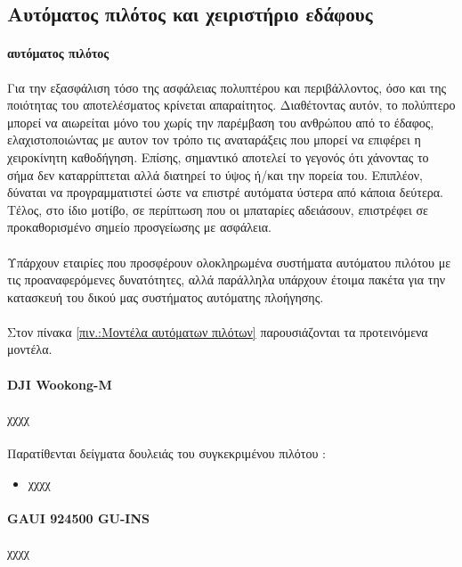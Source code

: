 \documentclass[a4paper, 12pt, twoside]{report}
\begin{document}
{{{{{{			
		\subsection{Αυτόματος πιλότος και χειριστήριο εδάφους}
			\paragraph{αυτόματος πιλότος}{Για την εξασφάλιση τόσο της ασφάλειας πολυπτέρου και περιβάλλοντος, όσο και της ποιότητας του αποτελέσματος κρίνεται απαραίτητος. Διαθέτοντας αυτόν, το πολύπτερο μπορεί να αιωρείται μόνο του χωρίς την παρέμβαση του ανθρώπου από το έδαφος, ελαχιστοποιώντας με αυτον τον τρόπο τις αναταράξεις που μπορεί να επιφέρει η χειροκίνητη καθοδήγηση. Επίσης, σημαντικό αποτελεί το γεγονός ότι χάνοντας το σήμα δεν καταρρίπτεται αλλά διατηρεί το ύψος ή/και την πορεία του. Επιπλέον, δύναται να προγραμματιστεί ώστε να επιστρέ αυτόματα ύστερα από κάποια δεύτερα. Τέλος, στο ίδιο μοτίβο, σε περίπτωση που οι μπαταρίες αδειάσουν, επιστρέφει σε προκαθορισμένο σημείο προσγείωσης με ασφάλεια.
			}
			\paragraph{}{Υπάρχουν εταιρίες που προσφέρουν ολοκληρωμένα συστήματα αυτόματου πιλότου με τις προαναφερόμενες δυνατότητες, αλλά παράλληλα υπάρχουν έτοιμα πακέτα για την κατασκευή του δικού μας συστήματος αυτόματης πλοήγησης.
			}
			\paragraph{}{Στον πίνακα \ref{πιν.:Μοντέλα αυτόματων πιλότων} παρουσιάζονται τα προτεινόμενα μοντέλα.
			}
			\paragraph{DJI Wookong-M}{χχχχ
			}
			\paragraph{}{Παρατίθενται δείγματα δουλειάς του συγκεκριμένου πιλότου :
				\begin{itemize}
					\item \href{χχχχ}{χχχχ}
					
				\end{itemize}
			}
			
			\paragraph{GAUI 924500 GU-INS}{χχχχ
			}
}}}}}}
\end{document}

